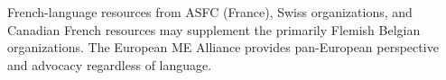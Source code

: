 \begin{remark}
French-language resources from ASFC (France), Swiss organizations, and Canadian French resources may supplement the primarily Flemish Belgian organizations. The European ME Alliance provides pan-European perspective and advocacy regardless of language.
\end{remark}
